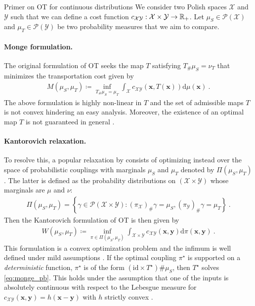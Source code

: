 \begin{mem1}{Primer on OT for continuous distributions}
    We consider two Polish spaces $\mathcal{X}$ and $\mathcal{Y}$ such that we can define a cost function $c_{\mathcal{X} \mathcal{Y}} : \mathcal{X} \times \mathcal{Y} \to \mathbb{R}_+$. Let $\mu_S \in \mathcal{P}(\mathcal{X})$ and $\mu_T \in \mathcal{P}(\mathcal{Y})$ be two probability measures that we aim to compare.

    \paragraph{Monge formulation.}
    The original formulation \citep{monge1781memoire} of OT seeks the map $T$ satisfying $T_{\#}\mu_S = \nu_T$ that minimizes the transportation cost given by
    \begin{align}\label{eq:monge_pb_continuous}
        M(\mu_S, \mu_T) \coloneqq \inf_{T_{\#}\mu_S = \mu_T} \int_{\mathcal{X}} c_{\mathcal{X} \mathcal{Y}}(\bm{x}, T(\bm{x})) \mathrm{d}\mu(\bm{x}) \:.
    \end{align}
    The above formulation is highly non-linear in $T$ and the set of admissible maps $T$ is not convex hindering an easy analysis. Moreover, the existence of an optimal map $T$ is not guaranteed in general \citep{santambrogio2015optimal}.
    
    \paragraph{Kantorovich relaxation.} To resolve this, a popular relaxation by \citep{kantorovich1942translocation} consists of optimizing instead over the space of probabilistic couplings with marginals $\mu_S$ and $\mu_T$ denoted by $\Pi(\mu_S, \mu_T)$. 
    The latter is defined as the probability distributions on $(\mathcal{X} \times \mathcal{Y})$ whose marginals are $\mu$ and $\nu$:
    \begin{align}
        \Pi(\mu_S, \mu_T) = \left\{ \gamma \in \mathcal{P}(\mathcal{X} \times \mathcal{Y}) : (\pi_{\mathcal{X}})_\# \gamma = \mu_S, (\pi_{\mathcal{Y}})_\# \gamma = \mu_T \right\} \:.
    \end{align}
    Then the Kantorovich formulation of OT is then given by
    \begin{align}\label{eq:Wasserstein}
        W(\mu_S, \mu_T) \coloneqq \inf_{\pi \in \Pi(\mu_S, \mu_T)} \int_{\mathcal{X} \times \mathcal{Y}} c_{\mathcal{X} \mathcal{Y}}(\bm{x}, \bm{y}) \mathrm{d}\pi(\bm{x}, \bm{y}) \:.
    \end{align}
    This formulation is a convex optimization problem and the infimum is well
    defined under mild assumptions \citep{santambrogio2015optimal}. If the optimal
    coupling $\pi^\star$ is supported on a \emph{deterministic} function, \ie
    $\pi^\star$ is of the form $(\mathrm{id} \times T^\star)\# \mu_S$, then
    $T^\star$ solves \eqref{eq:monge_pb}. This holds under the assumption that one
    of the inputs is absolutely continuous with respect to the Lebesgue measure
    for $c_{\mathcal{X} \mathcal{Y}}(\bm{x}, \bm{y}) = h(\bm{x} - \bm{y})$ with
    $h$ strictly convex \citep{gangbo1996geometry}.
    
    \end{mem1}

